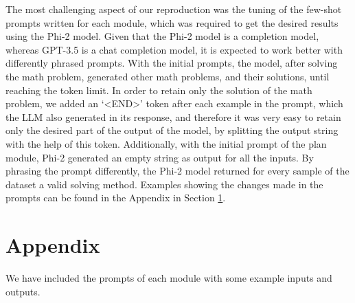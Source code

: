 \documentclass[10pt]{article} %
\begin{document}
The most challenging aspect of our reproduction was the tuning of the few-shot prompts written for each module, which was required to get the desired results using the Phi-2 model. 
Given that the Phi-2 model is a completion model, whereas GPT-3.5 is a chat completion model, it is expected to work better with differently phrased prompts. With the initial prompts, the model, after solving the math problem, generated other math problems, and their solutions, until reaching the token limit. 
In order to retain only the solution of the math problem, we added an `<END>' token after each example in the prompt, which the LLM also generated in its response, and therefore it was very easy to retain only the desired part of the output of the model, by splitting the output string with the help of this token. Additionally, with the initial prompt of the plan module, Phi-2 generated an empty string as output for all the inputs. By phrasing the prompt differently, the Phi-2 model returned for every sample of the dataset a valid solving method.
Examples showing the changes made in the prompts can be found in the Appendix in Section \ref{appen}.






\appendix
\section{Appendix}
\label{appen}
We have included the prompts of each module with some example inputs and outputs.
\end{document}
